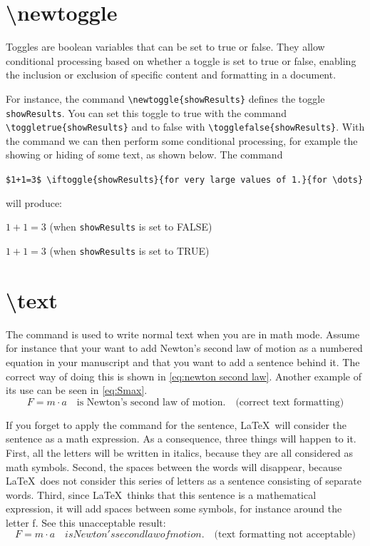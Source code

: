 \section{\textbackslash newtoggle}
Toggles are boolean variables that can be set to true or false. They allow conditional processing based on whether a toggle is set to true or false, enabling the inclusion or exclusion of specific content and formatting in a document.

For instance, the command \verb|\newtoggle{showResults}| defines the toggle \verb|showResults|. You can set this toggle to true with the command \verb|\toggletrue{showResults}| and to false with \verb|\togglefalse{showResults}|. With the command  we can then perform some conditional processing, for example the showing or hiding of some text, as shown below. The command

\verb|$1+1=3$ \iftoggle{showResults}{for very large values of 1.}{for \dots}|

will produce:

\togglefalse{showResults}
$1+1 = 3$ \iftoggle{showResults}{for very large values of 1}{for \dots} (when \verb|showResults| is set to FALSE)

\toggletrue{showResults}
$1+1 = 3$ \iftoggle{showResults}{for very large values of 1}{for \dots} (when \verb|showResults| is set to TRUE)

\section{\textbackslash text}
The command  is used to write normal text when you are in math mode. Assume for instance that your want to add Newton's second law of motion as a numbered equation in your manuscript and that you want to add a sentence behind it. The correct way of doing this is shown in \cref{eq:newton second law}. Another example of its use can be seen in \cref{eq:Smax}.
\begin{equation}\label{eq:newton second law}
    F=m\cdot a \quad \text{is Newton's second law of motion.}\quad\text{(correct text formatting)}
\end{equation}

If you forget to apply the command  for the sentence, \LaTeX\ will consider the sentence as a math expression. As a consequence, three things will happen to it. First, all the letters will be written in italics, because they are all considered as math symbols. Second, the spaces between the words will disappear, because \LaTeX\ does not consider this series of letters as a sentence consisting of separate words. Third, since \LaTeX\ thinks that this sentence is a mathematical expression, it will add spaces between some symbols, for instance around the letter f. See this unacceptable result:
\begin{equation*}
    F=m\cdot a \quad is Newton's second law of motion.\quad\text{(text formatting not acceptable)}
\end{equation*}

